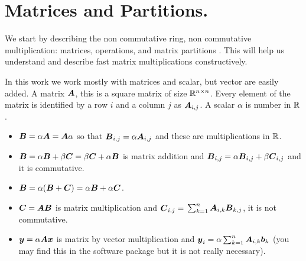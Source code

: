 \documentclass[acmsmall]{acmart}
\begin{document}
\section{Matrices and Partitions.}
\label{sec:matrices}
We start by describing the non commutative ring, non commutative
multiplication: matrices, operations, and matrix partitions . This
will help us understand and describe fast matrix multiplications
constructively.

In this work we work mostly with matrices and scalar, but vector are
easily added. A matrix ${\boldsymbol A}$, this is a square matrix of size
$\mathbb{R}^{n\times n}$. Every element of the matrix is identified by a row
$i$ and a column $j$ as ${\boldsymbol A}_{i,j}$. A scalar $\alpha$ is number in
$\mathbb{R}$.
\begin{itemize}
  \item ${\boldsymbol B} = \alpha{\boldsymbol A} = {\boldsymbol A}\alpha$ so that ${\boldsymbol B}_{i,j} =
    \alpha{\boldsymbol A}_{i,j}$ and these are multiplications in $\mathbb{R}$.
  \item ${\boldsymbol B} = \alpha{\boldsymbol B} + \beta{\boldsymbol C}= \beta{\boldsymbol C} +
    \alpha{\boldsymbol B}$ is matrix addition and ${\boldsymbol B}_{i,j} =
    \alpha{\boldsymbol B}_{i,j} + \beta{\boldsymbol C}_{i,j}$ and it is commutative.
  \item ${\boldsymbol B} = \alpha({\boldsymbol B} + {\boldsymbol C}) = \alpha{\boldsymbol B} +
    \alpha{\boldsymbol C}$. 
  \item ${\boldsymbol C}= {\boldsymbol A}{\boldsymbol B}$ is matrix multiplication and ${\boldsymbol C}_{i,j}=$ 
    $\sum_{k=1}^n {\boldsymbol A}_{i,k}{\boldsymbol B}_{k,j}$, it is not commutative.
  \item ${\boldsymbol y}= \alpha{\boldsymbol A}{\boldsymbol x}$ is matrix by vector
    multiplication and ${\boldsymbol y}_{i}=\alpha \sum_{k=1}^n
    {\boldsymbol A}_{i,k}{\boldsymbol b}_{k}$ (you may find this in the software package
    but it is not really necessary).
\end{itemize}
\end{document}
